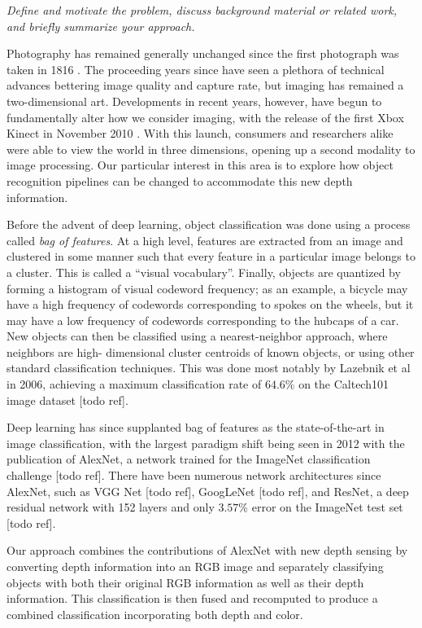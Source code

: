 
\textit{Define and motivate the problem, discuss background material or related work, and briefly summarize your approach.}

Photography has remained generally unchanged since the first photograph was
taken in 1816 \cite{Beaumont1982_photography}. The proceeding years since have
seen a plethora of technical advances bettering image quality and capture rate,
but imaging has remained a two-dimensional art. Developments in recent years,
however, have begun to fundamentally alter how we consider imaging, with the
release of the first Xbox Kinect in November 2010 \cite{Alex2009_kinect}. With
this launch, consumers and researchers alike were able to view the world in
three dimensions, opening up a second modality to image processing. Our
particular interest in this area is to explore how object recognition pipelines
can be changed to accommodate this new depth information.

Before the advent of deep learning, object classification was done using a
process called \textit{bag of features}. At a high level, features are extracted
from an image and clustered in some manner such that every feature in a
particular image belongs to a cluster. This is called a ``visual vocabulary''.
Finally, objects are quantized by forming a histogram of visual codeword
frequency; as an example, a bicycle may have a high frequency of codewords
corresponding to spokes on the wheels, but it may have a low frequency of
codewords corresponding to the hubcaps of a car. New objects can then be
classified using a nearest-neighbor approach, where neighbors are high-
dimensional cluster centroids of known objects, or using other standard
classification techniques. This was done most notably by Lazebnik et al in 2006,
achieving a maximum classification rate of $64.6\%$ on the Caltech101 image
dataset [todo ref].

Deep learning has since supplanted bag of features as the state-of-the-art in
image classification, with the largest paradigm shift being seen in 2012 with
the publication of AlexNet, a network trained for the ImageNet classification
challenge [todo ref]. There have been numerous network architectures since
AlexNet, such as VGG Net [todo ref], GoogLeNet [todo ref], and ResNet, a deep
residual network with 152 layers and only $3.57\%$ error on the ImageNet test
set [todo ref].

Our approach combines the contributions of AlexNet with new depth sensing by converting depth information into an RGB image and separately classifying objects with both their original RGB information as well as their depth information. This classification is then fused and recomputed to produce a combined classification incorporating both depth and color. 
